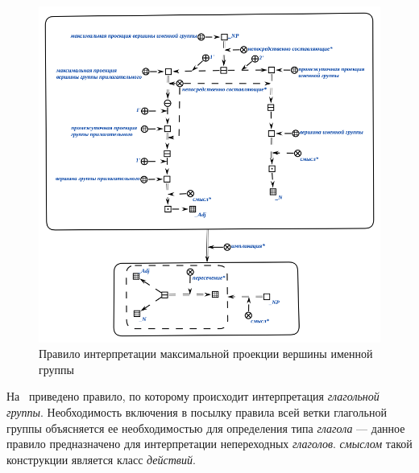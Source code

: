 \begin{figure}[h]
    \centering
    \includegraphics[scale=0.8]{images/part2/chapter_lang/d_sem_2}
    \caption{Правило интерпретации максимальной проекции вершины именной группы}
    \label{fig:d_sem_2}
\end{figure}

На~\textit{} приведено правило, по которому происходит интерпретация \textit{глагольной группы}.
Необходимость включения в посылку правила всей ветки глагольной группы объясняется ее необходимостью для определения типа \textit{глагола} --- данное правило предназначено для интерпретации непереходных \textit{глаголов}.
\textit{смыслом} такой конструкции является класс \textit{действий}.

